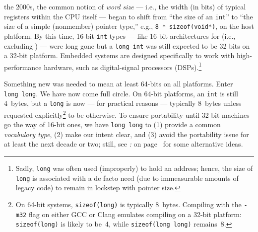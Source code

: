 the 2000s, the common notion of \emph{word size} --- i.e., the width (in
bits) of typical registers within the CPU itself --- began to shift from
``the size of an \lstinline!int!'' to ``the size of a simple (nonmember)
pointer type,'' e.g., \lstinline!8!~\lstinline!*!~\lstinline!sizeof(void*)!, on the host platform. By this time, 16-bit \lstinline!int! types --- like 16-bit architectures for  (i.e., excluding ) --- were long gone but a \lstinline!long!~\lstinline!int! was still expected to be 32 bits on a 32-bit platform. Embedded systems are designed specifically to work with high-performance hardware, such as digital-signal processors (DSPs).{\cprotect\footnote{Sadly,
\lstinline!long! was often used (improperly) to hold an address; hence,
the size of \lstinline!long! is associated with a de facto need (due to immeasurable amounts of legacy code) to remain in lockstep with pointer size.}}

Something new was needed to mean at least 64-bits on all platforms.
Enter \lstinline!long!~\lstinline!long!. We have now come full circle. On
64-bit platforms, an \lstinline!int! is still 4~bytes, but a \lstinline!long!
is now --- for practical reasons --- typically 8~bytes unless requested
explicitly{\cprotect\footnote{On 64-bit systems, \lstinline!sizeof(long)!
is typically 8~bytes. Compiling with the \lstinline!-m32! flag on either
GCC or Clang emulates compiling on a 32-bit platform:
\lstinline!sizeof(long)! is likely to be~4, while
  \lstinline!sizeof(long!~\lstinline!long)! remains~8.}} to be otherwise. To ensure portability until 32-bit machines go the way of 16-bit ones,
we have \lstinline!long!~\lstinline!long! to (1) provide a common \emph{vocabulary type}, (2)
make our intent clear, and (3) avoid the portability issue for
at least the next decade or two; still, see {\it{}: } on page~\pageref{relying-on-the-relative-sizes-of-int,-long,-and-long-long} for some alternative ideas.



